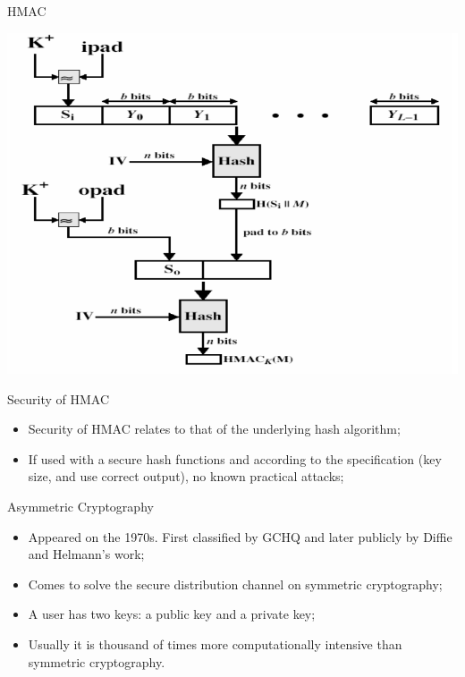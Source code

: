 \documentclass[12pt,table,xcolor={dvipsnames}]{beamer}
\begin{document}
\begin{frame}{HMAC}
\begin{center}
\includegraphics[scale=.33]{HMAC.png}
\end{center}
\end{frame}

\begin{frame}{Security of HMAC}
\begin{itemize}
\item Security of HMAC relates to that of the underlying hash algorithm;
\item If used with a secure hash functions and according to the specification (key size, and use correct output), no known practical attacks;
\end{itemize}
\end{frame}

\begin{frame}{Asymmetric Cryptography}
\begin{itemize}
\item Appeared on the 1970s. First classified by GCHQ and later publicly by Diffie and Helmann's work;\pause
\item Comes to solve the secure distribution channel on symmetric cryptography;\pause
\item A user has two keys: a public key and a private key;\pause 
\item Usually it is thousand of times more computationally intensive than symmetric cryptography.
\end{itemize}
\end{frame}
\end{document}
